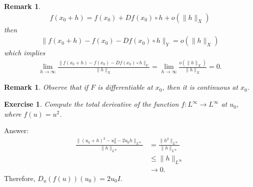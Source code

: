 \documentclass[12pt,reqno]{amsart}
\numberwithin{equation}{section}  %
\newtheorem{remark}[theorem]{Remark}
\newtheorem {exercise}[theorem]{Exercise}
\begin{document}
\begin{framed}
\begin{remark}
    \begin{equation*}
    \begin{split}
      f(x_{0} + h) = f(x_{0}) + Df(x_{0}) \circ h + o(\| h \|_{X})
    \end{split}
    \end{equation*}
    then
    \begin{equation*}
    \begin{split}
      \| f(x_{0} + h) - f(x_{0}) - Df(x_{0}) \circ h \|_{Y} = o(\| h
      \|_{X})
    \end{split}
    \end{equation*}
    which implies
    \begin{equation*}
    \begin{split}
      \lim_{h \to \infty} \frac{\| f(x_{0} + h) - f(x_{0}) - Df(x_{0}) \circ h
      \|_{Y}}{\| h \|_{X}}  = \lim_{h \to \infty} \frac{o(\| h \|_{X})}{\| h
      \|_{X}} = 0.
    \end{split}
    \end{equation*}
  \label{rem:equiv-def}
  \end{remark}
  \end{framed}
%
\begin{framed}
%
%
\begin{remark}
    Observe that if $F$ is differentiable at $x_{0}$, then it is continuous at $x_{0}$.
\label{rem:deriv-imp-cont}
\end{remark}
%
%
\end{framed}
\begin{framed}
    \begin{exercise}
        Compute the total
        derivative of the function $f:L^{\infty} \to L^{\infty}$ at $u_{0}$,
        where $f(u) = u^{2}$. 
    \end{exercise}
    Answer:       %
    \begin{equation*}
    \begin{split}
    \frac{\| (u_{0} + h)^{2} - u_{0}^{2} - 2u_{0}h \|_{L^{\infty}}}{\| h
        \|_{L^{\infty}}}
        &=         \frac{\| h^{2} \|_{L^{\infty}}}{\| h \|_{L^{\infty}}}
        \\
        & \le \| h \|_{L^{\infty}} 
        \\
        & \to 0.
    \end{split}
    \end{equation*}
    Therefore, $D_{u}(f(u))(u_{0}) = 2u_{0}I$. 
\end{framed}
\end{document}
